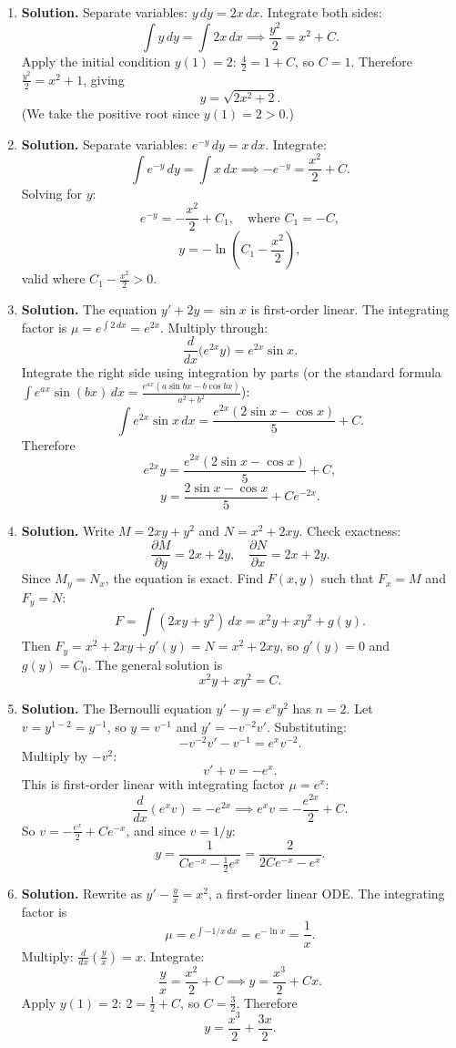 \begin{enumerate}
\item \textbf{Solution.}
Separate variables: $y\,dy = 2x\,dx$. Integrate both sides:
\[
\int y\,dy = \int 2x\,dx \implies \frac{y^2}{2}=x^2+C.
\]
Apply the initial condition $y(1)=2$: $\frac{4}{2}=1+C$, so $C=1$. Therefore $\frac{y^2}{2}=x^2+1$, giving
\[
\boxed{y = \sqrt{2x^2+2}}.
\]
(We take the positive root since $y(1)=2>0$.)

\item \textbf{Solution.}
Separate variables: $e^{-y}\,dy = x\,dx$. Integrate:
\[
\int e^{-y}\,dy = \int x\,dx \implies -e^{-y} = \frac{x^2}{2}+C.
\]
Solving for $y$:
\[
e^{-y} = -\frac{x^2}{2}+C_1, \quad \text{where } C_1=-C,
\]
\[
\boxed{y = -\ln\!\left(C_1-\frac{x^2}{2}\right)},
\]
valid where $C_1-\frac{x^2}{2}>0$.

\item \textbf{Solution.}
The equation $y'+2y=\sin x$ is first-order linear. The integrating factor is $\mu=e^{\int 2\,dx}=e^{2x}$. Multiply through:
\[
\frac{d}{dx}\bigl(e^{2x}y\bigr)=e^{2x}\sin x.
\]
Integrate the right side using integration by parts (or the standard formula $\int e^{ax}\sin(bx)\,dx = \frac{e^{ax}(a\sin bx - b\cos bx)}{a^2+b^2}$):
\[
\int e^{2x}\sin x\,dx = \frac{e^{2x}(2\sin x-\cos x)}{5}+C.
\]
Therefore
\[
e^{2x}y = \frac{e^{2x}(2\sin x - \cos x)}{5}+C,
\]
\[
\boxed{y = \frac{2\sin x - \cos x}{5}+Ce^{-2x}}.
\]

\item \textbf{Solution.}
Write $M=2xy+y^2$ and $N=x^2+2xy$. Check exactness:
\[
\frac{\partial M}{\partial y}=2x+2y, \quad \frac{\partial N}{\partial x}=2x+2y.
\]
Since $M_y=N_x$, the equation is exact. Find $F(x,y)$ such that $F_x=M$ and $F_y=N$:
\[
F = \int (2xy+y^2)\,dx = x^2y+xy^2+g(y).
\]
Then $F_y=x^2+2xy+g'(y)=N=x^2+2xy$, so $g'(y)=0$ and $g(y)=C_0$. The general solution is
\[
\boxed{x^2y+xy^2=C}.
\]

\item \textbf{Solution.}
The Bernoulli equation $y'-y=e^x y^2$ has $n=2$. Let $v=y^{1-2}=y^{-1}$, so $y=v^{-1}$ and $y'=-v^{-2}v'$. Substituting:
\[
-v^{-2}v'-v^{-1}=e^x v^{-2}.
\]
Multiply by $-v^2$:
\[
v'+v=-e^x.
\]
This is first-order linear with integrating factor $\mu=e^x$:
\[
\frac{d}{dx}(e^x v) = -e^{2x} \implies e^x v = -\frac{e^{2x}}{2}+C.
\]
So $v=-\frac{e^x}{2}+Ce^{-x}$, and since $v=1/y$:
\[
\boxed{y = \frac{1}{Ce^{-x}-\frac{1}{2}e^x} = \frac{2}{2Ce^{-x}-e^x}}.
\]

\item \textbf{Solution.}
Rewrite as $y'-\frac{y}{x}=x^2$, a first-order linear ODE. The integrating factor is
\[
\mu = e^{\int -1/x\,dx}=e^{-\ln x}=\frac{1}{x}.
\]
Multiply: $\frac{d}{dx}\!\left(\frac{y}{x}\right)=x$. Integrate:
\[
\frac{y}{x}=\frac{x^2}{2}+C \implies y = \frac{x^3}{2}+Cx.
\]
Apply $y(1)=2$: $2=\frac{1}{2}+C$, so $C=\frac{3}{2}$. Therefore
\[
\boxed{y=\frac{x^3}{2}+\frac{3x}{2}}.
\]


\end{enumerate}
